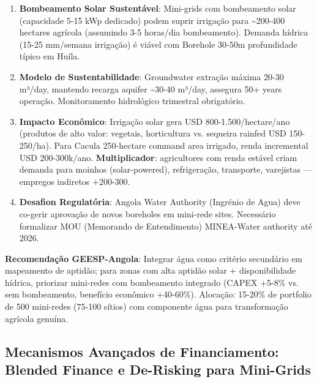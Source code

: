 \documentclass[12pt, a4paper]{article}
\begin{document}
\begin{enumerate}
\item\textbf{Bombeamento Solar Sustentável}: Mini-grids com bombeamento solar (capacidade 5-15 kWp dedicado) podem suprir irrigação para \textasciitilde{}200-400 hectares agrícola (assumindo 3-5 horas/dia bombeamento). Demanda hídrica (15-25 mm/semana irrigação) é viável com Borehole 30-50m profundidade típico em Huíla.
\item\textbf{Modelo de Sustentabilidade}: Groundwater extração máxima 20-30 m³/day, mantendo recarga aquifer \textasciitilde{}30-40 m³/day, assegura 50+ years operação. Monitoramento hidrológico trimestral obrigatório.
\item
\textbf{Impacto Econômico}: Irrigação solar gera USD 800-1.500/hectare/ano (produtos de alto valor: vegetais, horticultura vs. sequeira rainfed USD 150-250/ha). Para Cacula 250-hectare command area irrigado, renda incremental USD 200-300k/ano.
\textbf{Multiplicador}: agricultores com renda estável criam demanda para moinhos (solar-powered), refrigeração, transporte, varejistas — empregos indiretos +200-300.
\item\textbf{Desafion Regulatória}: Angola Water Authority (Ingrénio de Agua) deve co-gerir aprovação de novos boreholes em mini-rede sites. Necessário formalizar MOU (Memorando de Entendimento) MINEA-Water authority até 2026.
\end{enumerate}\textbf{Recomendação GEESP-Angola}: Integrar água como critério secundário em mapeamento de aptidão; para zonas com alta aptidão solar + disponibilidade hídrica, priorizar mini-redes com bombeamento integrado (CAPEX +5-8\% vs. sem bombeamento, benefício econômico +40-60\%). Alocação: 15-20\% de portfolio de 500 mini-redes (75-100 sítios) com componente água para transformação agrícola genuína.

\subsection{Mecanismos Avançados de Financiamento: Blended Finance e De-Risking para Mini-Grids}
\end{document}
